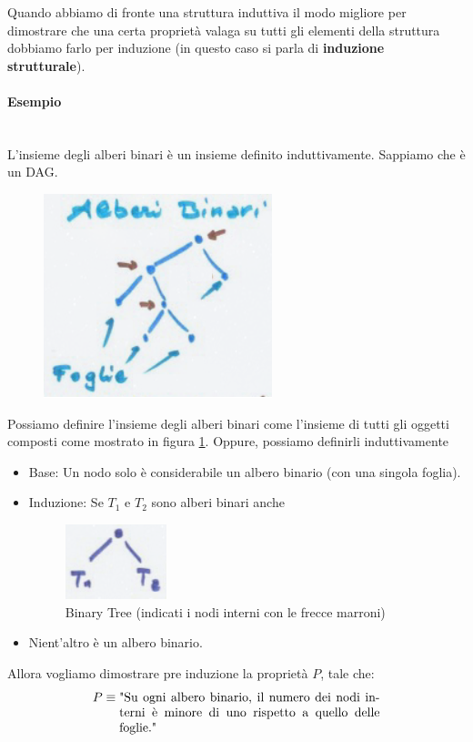 \documentclass{article}
\begin{document}
Quando abbiamo di fronte una struttura induttiva il modo migliore per dimostrare che una certa proprietà valaga su tutti
gli elementi della struttura dobbiamo farlo per induzione (in questo caso si parla di \textbf{induzione strutturale}).

\paragraph{Esempio}\mbox{}\\
L'insieme degli alberi binari è un insieme definito induttivamente. Sappiamo che è un DAG.
\begin{figure}[H]
    \centering
    \includegraphics[scale=0.5]{images/BT.png}
    \label{fig:bt}
\end{figure}
Possiamo definire l'insieme degli alberi binari come l'insieme di tutti gli oggetti composti come
mostrato in figura \ref{fig:bt}. Oppure, possiamo definirli induttivamente

\begin{itemize}
    \item Base: Un nodo solo è considerabile un albero binario (con una singola foglia).
    \item Induzione: Se $T_1$ e $T_2$ sono alberi binari anche
          \begin{figure}[H]
              \centering
              \includegraphics[scale=0.6]{images/BT_1.png}
              \caption{Binary Tree (indicati i nodi interni con le frecce marroni)}
          \end{figure}
    \item Nient'altro è un albero binario.
\end{itemize}
Allora vogliamo dimostrare pre induzione la proprietà $P$, tale che:
$$P\equiv \parbox[t]{.6\textwidth}{"Su ogni albero binario, il numero dei nodi interni è minore di uno rispetto
        a quello delle foglie."}$$
\end{document}
